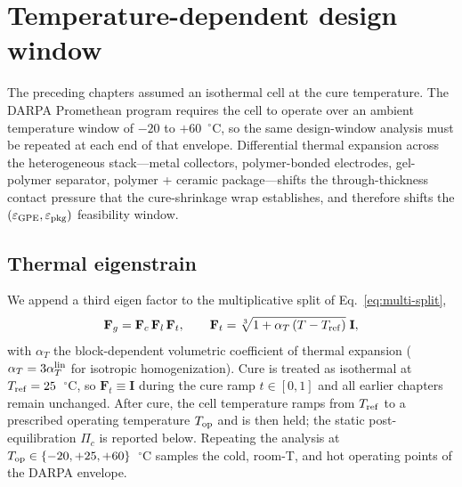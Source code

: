 \documentclass[11pt,letterpaper]{article}
\begin{document}
\section{Temperature-dependent design window}
\label{sec:T-window}

The preceding chapters assumed an isothermal cell at the cure
temperature.  The DARPA Promethean program requires the cell to
operate over an ambient temperature window of $-20$ to $+60$~$^\circ$C,
so the same design-window analysis must be repeated at each end of
that envelope.  Differential thermal expansion across the
heterogeneous stack---metal collectors, polymer-bonded electrodes,
gel-polymer separator, polymer + ceramic package---shifts the
through-thickness contact pressure that the cure-shrinkage wrap
establishes, and therefore shifts the $(\varepsilon_{\rm GPE},
\varepsilon_{\rm pkg})$ feasibility window.

\subsection{Thermal eigenstrain}

We append a third eigen factor to the multiplicative split of
Eq.~\eqref{eq:multi-split},
\begin{equation}
\mathbf{F}_g = \mathbf{F}_c\, \mathbf{F}_l\, \mathbf{F}_t , \qquad
\mathbf{F}_t = \sqrt[3]{1 + \alpha_T\,(T - T_{\rm ref})}\;\mathbf{I},
\label{eq:Ft}
\end{equation}
with $\alpha_T$ the block-dependent volumetric coefficient of thermal
expansion ($\alpha_T = 3\alpha_T^{\rm lin}$ for isotropic
homogenization).  Cure is treated as isothermal at $T_{\rm ref} =
25$~$^\circ$C, so $\mathbf{F}_t \equiv \mathbf{I}$ during the cure
ramp $t \in [0,1]$ and all earlier chapters remain unchanged.  After
cure, the cell temperature ramps from $T_{\rm ref}$ to a prescribed
operating temperature $T_{\rm op}$ and is then held; the static
post-equilibration $\Pi_c$ is reported below.  Repeating the analysis
at $T_{\rm op} \in \{-20, +25, +60\}$~$^\circ$C samples the cold,
room-T, and hot operating points of the DARPA envelope.
\end{document}

